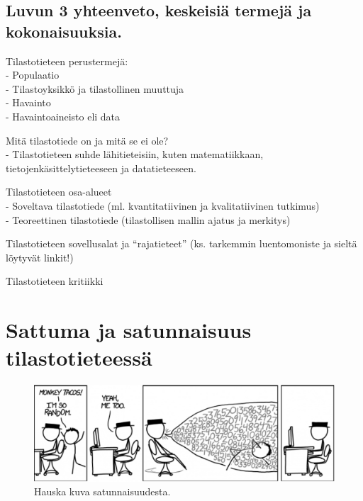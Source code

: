 \documentclass[
]{book}
\begin{document}
\hypertarget{luvun-3-yhteenveto-keskeisiuxe4-termejuxe4-ja-kokonaisuuksia.}{%
\section{Luvun 3 yhteenveto, keskeisiä termejä ja kokonaisuuksia.}\label{luvun-3-yhteenveto-keskeisiuxe4-termejuxe4-ja-kokonaisuuksia.}}

Tilastotieteen perustermejä:\\
- Populaatio\\
- Tilastoyksikkö ja tilastollinen muuttuja\\
- Havainto\\
- Havaintoaineisto eli data

Mitä tilastotiede on ja mitä se ei ole?\\
- Tilastotieteen suhde lähitieteisiin, kuten matematiikkaan, tietojenkäsittelytieteeseen ja datatieteeseen.

Tilastotieteen osa-alueet\\
- Soveltava tilastotiede (ml. kvantitatiivinen ja kvalitatiivinen tutkimus)\\
- Teoreettinen tilastotiede (tilastollisen mallin ajatus ja merkitys)

Tilastotieteen sovellusalat ja ``rajatieteet'' (ks. tarkemmin luentomoniste ja sieltä löytyvät linkit!)

Tilastotieteen kritiikki

\hypertarget{luku4}{%
\chapter{Sattuma ja satunnaisuus tilastotieteessä}\label{luku4}}

\begin{figure}

{\centering \includegraphics[width=1\linewidth]{images/im_so_random} 

}

\caption{Hauska kuva satunnaisuudesta.}\label{fig:random}
\end{figure}
\end{document}
